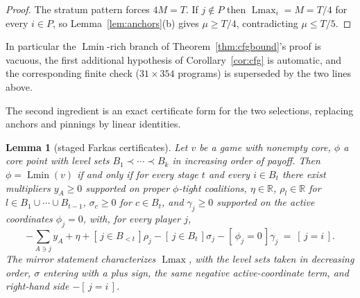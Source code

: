 \documentclass[11pt]{article}
\newtheorem{lemma}[theorem]{Lemma}
\newcommand{\Lmin}{\operatorname{Lmin}}
\newcommand{\Lmax}{\operatorname{Lmax}}
\begin{document}
\begin{proof}
The stratum pattern forces $4M=T$.  If $j\notin P$ then $\Lmax_i=M=T/4$
for every $i\in P$, so Lemma~\ref{lem:anchors}(b) gives $\mu\ge T/4$,
contradicting $\mu\le T/5$.
\end{proof}

In particular the $\Lmin$-rich branch of Theorem~\ref{thm:cfgbound}'s proof
is vacuous, the first additional hypothesis of Corollary~\ref{cor:cfg} is
automatic, and the corresponding finite check ($31\times354$ programs) is
superseded by the two lines above.

The second ingredient is an exact certificate form for the two selections,
replacing anchors and pinnings by linear identities.

\begin{lemma}[staged Farkas certificates]\label{lem:staged}
Let $v$ be a game with nonempty core, $\phi$ a core point with level sets
$B_1\prec\cdots\prec B_k$ in increasing order of payoff.  Then
$\phi=\Lmin(v)$ if and only if for every stage $t$ and every $i\in B_t$
there exist multipliers $y_A\ge0$ supported on proper $\phi$-tight
coalitions, $\eta\in\mathbb R$, $\rho_l\in\mathbb R$ for
$l\in B_1\cup\cdots\cup B_{t-1}$, $\sigma_c\ge0$ for $c\in B_t$, and
$\gamma_j\ge0$ supported on the active coordinates $\phi_j=0$, with, for
every player $j$,
\[
 -\sum_{A\ni j}y_A+\eta+[\,j\in B_{<t}\,]\rho_j-[\,j\in B_t\,]\sigma_j
 -[\,\phi_j=0\,]\gamma_j
 \ =\ [\,j=i\,].
\]
The mirror statement characterizes $\Lmax$, with the level sets taken in
decreasing order, $\sigma$ entering with a plus sign, the same negative
active-coordinate term, and right-hand side $-[\,j=i\,]$.
\end{lemma}
\end{document}
